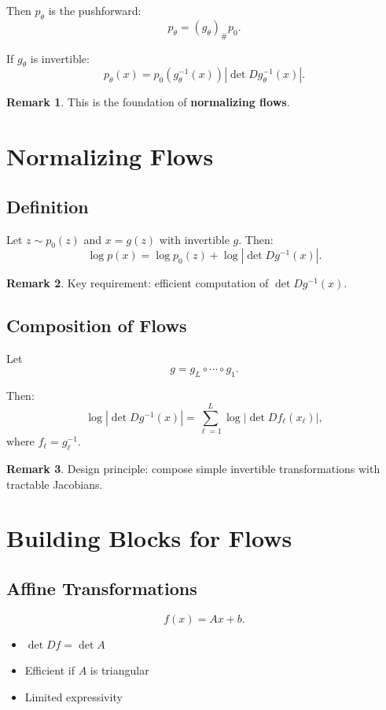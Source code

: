 \documentclass[12pt,oneside]{book}
\numberwithin{equation}{section}
\theoremstyle{definition}
\newtheorem{remark}{Remark}[section]
\theoremstyle{plain}
\theoremstyle{remark}
\begin{document}
Then $p_\theta$ is the pushforward:
\[
p_\theta = (g_\theta)_\# p_0.
\]

If $g_\theta$ is invertible:
\[
p_\theta(x)
=
p_0(g_\theta^{-1}(x)) \left| \det D g_\theta^{-1}(x) \right|.
\]

\begin{remark}
This is the foundation of \textbf{normalizing flows}.
\end{remark}

\section{Normalizing Flows}

\subsection{Definition}

Let $z \sim p_0(z)$ and $x = g(z)$ with invertible $g$. Then:
\[
\log p(x)
=
\log p_0(z) + \log \left| \det D g^{-1}(x) \right|.
\]

\begin{remark}
Key requirement: efficient computation of $\det D g^{-1}(x)$.
\end{remark}

\subsection{Composition of Flows}

Let
\[
g = g_L \circ \cdots \circ g_1.
\]

Then:
\[
\log \left| \det D g^{-1}(x) \right|
=
\sum_{\ell=1}^L \log \left| \det D f_\ell(x_\ell) \right|,
\]
where $f_\ell = g_\ell^{-1}$.

\begin{remark}
Design principle: compose simple invertible transformations with tractable Jacobians.
\end{remark}

\section{Building Blocks for Flows}

\subsection{Affine Transformations}

\[
f(x) = Ax + b.
\]

\begin{itemize}
    \item $\det Df = \det A$
    \item Efficient if $A$ is triangular
    \item Limited expressivity
\end{itemize}
\end{document}
